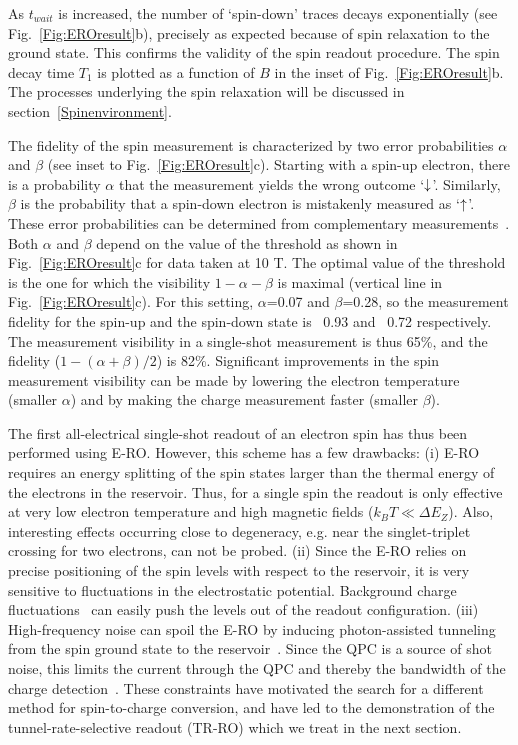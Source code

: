 \documentclass[rmp,twocolumn,aps]{revtex4}
\begin{document}
As $t_{wait}$ is increased, the number of `spin-down' traces
decays exponentially (see Fig.~\ref{Fig:EROresult}b), precisely as expected because of spin relaxation to the ground state. This confirms
the validity of the spin readout procedure. The spin decay time
$T_1$ is plotted as a function of $B$ in the inset of
Fig.~\ref{Fig:EROresult}b. The processes underlying the spin
relaxation will be discussed in section~\ref{Spinenvironment}.

The fidelity of the spin measurement is characterized by two error
probabilities $\alpha$ and $\beta$ (see inset to
Fig.~\ref{Fig:EROresult}c). Starting with a spin-up electron, there is a probability $\alpha$ that the measurement yields the wrong outcome `$\downarrow$'. Similarly, $\beta$ is the probability that a spin-down electron is mistakenly measured as `$\uparrow$'. These error probabilities can be determined from
complementary measurements~\cite{ElzermanNature2004}. Both
$\alpha$ and $\beta$ depend on the value of the threshold as shown
in Fig.~\ref{Fig:EROresult}c for data taken at 10 T. The optimal
value of the threshold is the one for which the visibility
$1-\alpha-\beta$ is maximal (vertical line in
Fig.~\ref{Fig:EROresult}c). For this setting, $\alpha$=0.07 and
$\beta$=0.28, so the measurement fidelity for the spin-up and the
spin-down state is ~0.93 and ~0.72 respectively. The measurement
visibility in a single-shot measurement is thus 65\%, and the
fidelity ($1-(\alpha+\beta)/2$) is 82\%. Significant improvements
in the spin measurement visibility can be made by lowering the
electron temperature (smaller $\alpha$) and by making the charge
measurement faster (smaller $\beta$).

The first all-electrical single-shot readout of an electron spin
has thus been performed using E-RO. However, this scheme has a few
drawbacks: (i) E-RO requires an energy splitting of the spin
states larger than the thermal energy of the electrons in the
reservoir. Thus, for a single spin the readout is only effective
at very low electron temperature and high magnetic fields ($k_B
T\ll \Delta E_Z$). Also, interesting effects occurring close to
degeneracy, e.g. near the singlet-triplet crossing for two
electrons, can not be probed. (ii) Since the E-RO relies on
precise positioning of the spin levels with respect to the
reservoir, it is very sensitive to fluctuations in the
electrostatic potential. Background charge
fluctuations~\cite{FujisawaChargeNoise} can easily push the levels
out of the readout configuration. (iii) High-frequency noise can
spoil the E-RO by inducing photon-assisted tunneling from the spin
ground state to the reservoir~\cite{OnacPRL2006}. Since the QPC is
a source of shot noise, this limits the current through the QPC
and thereby the bandwidth of the charge
detection~\cite{VandersypenAPL2004}. These constraints have
motivated the search for a different method for spin-to-charge
conversion, and have led to the demonstration of the
tunnel-rate-selective readout (TR-RO) which we treat in the next
section.
\end{document}
